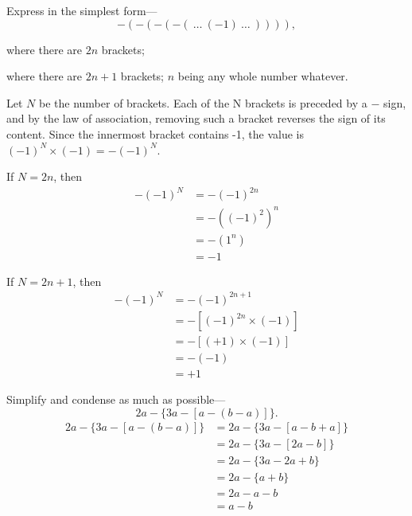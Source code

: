 \documentclass[DIN, pagenumber=false, fontsize=11pt, parskip=half]{scrartcl}
\begin{document}
\begin{problems}[from=1,step=1]
    \problem Express in the simplest form---
    \[
        -(-(-(-(\ \dots\ (-1)\ \dots\ )))),
    \]
    \begin{parts}
        \item where there are $2n$ brackets;
        \item where there are $2n+1$ brackets; $n$ being any whole number whatever.
    \end{parts}
    
    \answer 
    Let $N$ be the number of brackets. 
    Each of the N brackets is preceded by a $-$ sign, and by the law of association, removing such a bracket reverses the sign of its content. Since the innermost bracket contains -1, the value is $(-1)^N \times (-1) = -(-1)^N$.
    \begin{parts}
    \item If $N = 2n$, then 
        \begin{align*}
            -(-1)^N &= -(-1)^{2n}\\ 
                    &= -((-1)^2)^n\\ 
                    &= -(1^n)\\ 
                    &= -1
        \end{align*}
    \item If $N = 2n+1$, then 
        \begin{align*}
            -(-1)^N &= -(-1)^{2n+1}\\ 
                    &= -[(-1)^{2n}\times(-1)]\\ 
                    &= -[(+1) \times (-1)]\\ 
                    &= -(-1)\\ 
                    &= +1
        \end{align*}
    \end{parts}


    \problem Simplify and condense as much as possible---
    \[
        2a - \{3a - [a - (b - a)]\}.
    \]
    \answer
    \begin{align*}
        2a-\{3a-[a-(b-a)]\} &= 2a-\{3a-[a-b+a]\}\\ 
                            &= 2a-\{3a-[2a-b]\}\\ 
                            &= 2a-\{3a-2a+b\}\\ 
                            &= 2a-\{a+b\}\\ 
                          &= 2a-a-b\\ 
                          &= a-b
    \end{align*}


\end{problems}
\end{document}
